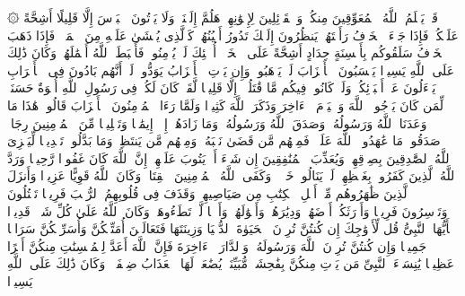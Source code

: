 \startbuffer[\q:33:18]
۞ قَدۡ یَعۡلَمُ ٱللَّهُ ٱلۡمُعَوِّقِینَ مِنكُمۡ وَٱلۡقَاۤئِلِینَ لِإِخۡوَٰنِهِمۡ هَلُمَّ إِلَیۡنَاۖ وَلَا یَأۡتُونَ ٱلۡبَأۡسَ إِلَّا قَلِیلًا%
\stopbuffer%
\startbuffer[\q:33:19]
أَشِحَّةً عَلَیۡكُمۡۖ فَإِذَا جَاۤءَ ٱلۡخَوۡفُ رَأَیۡتَهُمۡ یَنظُرُونَ إِلَیۡكَ تَدُورُ أَعۡیُنُهُمۡ كَٱلَّذِی یُغۡشَىٰ عَلَیۡهِ مِنَ ٱلۡمَوۡتِۖ فَإِذَا ذَهَبَ ٱلۡخَوۡفُ سَلَقُوكُم بِأَلۡسِنَةٍ حِدَادٍ أَشِحَّةً عَلَى ٱلۡخَیۡرِۚ أُو۟لَٰۤئِكَ لَمۡ یُؤۡمِنُوا۟ فَأَحۡبَطَ ٱللَّهُ أَعۡمَٰلَهُمۡۚ وَكَانَ ذَٰلِكَ عَلَى ٱللَّهِ یَسِیرࣰا%
\stopbuffer%
\startbuffer[\q:33:20]
یَحۡسَبُونَ ٱلۡأَحۡزَابَ لَمۡ یَذۡهَبُوا۟ۖ وَإِن یَأۡتِ ٱلۡأَحۡزَابُ یَوَدُّوا۟ لَوۡ أَنَّهُم بَادُونَ فِی ٱلۡأَعۡرَابِ یَسۡءَلُونَ عَنۡ أَنۢبَاۤئِكُمۡۖ وَلَوۡ كَانُوا۟ فِیكُم مَّا قَٰتَلُوۤا۟ إِلَّا قَلِیلࣰا%
\stopbuffer%
\startbuffer[\q:33:21]
لَّقَدۡ كَانَ لَكُمۡ فِی رَسُولِ ٱللَّهِ أُسۡوَةٌ حَسَنَةࣱ لِّمَن كَانَ یَرۡجُوا۟ ٱللَّهَ وَٱلۡیَوۡمَ ٱلۡءَاخِرَ وَذَكَرَ ٱللَّهَ كَثِیرࣰا%
\stopbuffer%
\startbuffer[\q:33:22]
وَلَمَّا رَءَا ٱلۡمُؤۡمِنُونَ ٱلۡأَحۡزَابَ قَالُوا۟ هَٰذَا مَا وَعَدَنَا ٱللَّهُ وَرَسُولُهُۥ وَصَدَقَ ٱللَّهُ وَرَسُولُهُۥۚ وَمَا زَادَهُمۡ إِلَّاۤ إِیمَٰنࣰا وَتَسۡلِیمࣰا%
\stopbuffer%
\startbuffer[\q:33:23]
مِّنَ ٱلۡمُؤۡمِنِینَ رِجَالࣱ صَدَقُوا۟ مَا عَٰهَدُوا۟ ٱللَّهَ عَلَیۡهِۖ فَمِنۡهُم مَّن قَضَىٰ نَحۡبَهُۥ وَمِنۡهُم مَّن یَنتَظِرُۖ وَمَا بَدَّلُوا۟ تَبۡدِیلࣰا%
\stopbuffer%
\startbuffer[\q:33:24]
لِّیَجۡزِیَ ٱللَّهُ ٱلصَّٰدِقِینَ بِصِدۡقِهِمۡ وَیُعَذِّبَ ٱلۡمُنَٰفِقِینَ إِن شَاۤءَ أَوۡ یَتُوبَ عَلَیۡهِمۡۚ إِنَّ ٱللَّهَ كَانَ غَفُورࣰا رَّحِیمࣰا%
\stopbuffer%
\startbuffer[\q:33:25]
وَرَدَّ ٱللَّهُ ٱلَّذِینَ كَفَرُوا۟ بِغَیۡظِهِمۡ لَمۡ یَنَالُوا۟ خَیۡرࣰاۚ وَكَفَى ٱللَّهُ ٱلۡمُؤۡمِنِینَ ٱلۡقِتَالَۚ وَكَانَ ٱللَّهُ قَوِیًّا عَزِیزࣰا%
\stopbuffer%
\startbuffer[\q:33:26]
وَأَنزَلَ ٱلَّذِینَ ظَٰهَرُوهُم مِّنۡ أَهۡلِ ٱلۡكِتَٰبِ مِن صَیَاصِیهِمۡ وَقَذَفَ فِی قُلُوبِهِمُ ٱلرُّعۡبَ فَرِیقࣰا تَقۡتُلُونَ وَتَأۡسِرُونَ فَرِیقࣰا%
\stopbuffer%
\startbuffer[\q:33:27]
وَأَوۡرَثَكُمۡ أَرۡضَهُمۡ وَدِیَٰرَهُمۡ وَأَمۡوَٰلَهُمۡ وَأَرۡضࣰا لَّمۡ تَطَءُوهَاۚ وَكَانَ ٱللَّهُ عَلَىٰ كُلِّ شَیۡءࣲ قَدِیرࣰا%
\stopbuffer%
\startbuffer[\q:33:28]
یَٰۤأَیُّهَا ٱلنَّبِیُّ قُل لِّأَزۡوَٰجِكَ إِن كُنتُنَّ تُرِدۡنَ ٱلۡحَیَوٰةَ ٱلدُّنۡیَا وَزِینَتَهَا فَتَعَالَیۡنَ أُمَتِّعۡكُنَّ وَأُسَرِّحۡكُنَّ سَرَاحࣰا جَمِیلࣰا%
\stopbuffer%
\startbuffer[\q:33:29]
وَإِن كُنتُنَّ تُرِدۡنَ ٱللَّهَ وَرَسُولَهُۥ وَٱلدَّارَ ٱلۡءَاخِرَةَ فَإِنَّ ٱللَّهَ أَعَدَّ لِلۡمُحۡسِنَٰتِ مِنكُنَّ أَجۡرًا عَظِیمࣰا%
\stopbuffer%
\startbuffer[\q:33:30]
یَٰنِسَاۤءَ ٱلنَّبِیِّ مَن یَأۡتِ مِنكُنَّ بِفَٰحِشَةࣲ مُّبَیِّنَةࣲ یُضَٰعَفۡ لَهَا ٱلۡعَذَابُ ضِعۡفَیۡنِۚ وَكَانَ ذَٰلِكَ عَلَى ٱللَّهِ یَسِیرࣰا%
